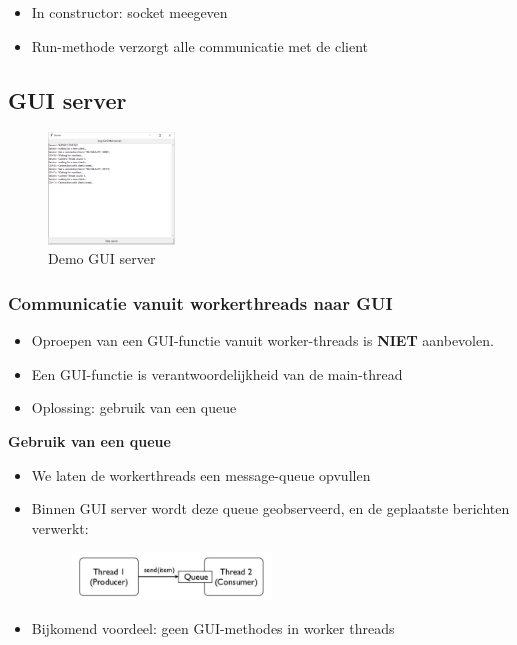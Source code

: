 \documentclass{article}
\begin{document}
\begin{itemize}
    \item In constructor: socket meegeven
    \item Run-methode verzorgt alle communicatie met de client
\end{itemize}


\subsection{GUI server}

\begin{figure}[H]
    \centering
    \includegraphics[width=0.3\textwidth]{multithreaded-server-gui.png}
    \caption{Demo GUI server}
\end{figure}


\subsubsection{Communicatie vanuit workerthreads naar GUI}

\begin{itemize}
    \item Oproepen van een GUI-functie vanuit worker-threads is \textbf{NIET} aanbevolen.
    \item Een GUI-functie is verantwoordelijkheid van de main-thread
    \item Oplossing: gebruik van een queue
\end{itemize}

\textbf{Gebruik van een queue}

\begin{itemize}
    \item We laten de workerthreads een message-queue opvullen
    \item Binnen GUI server wordt deze queue geobserveerd, en de geplaatste berichten verwerkt:
    \begin{figure}[H]
        \centering
        \includegraphics[width=0.5\textwidth]{multithreaded-server-gui-queue.png}
    \end{figure}
    \item Bijkomend voordeel: geen GUI-methodes in worker threads
\end{itemize}
\end{document}
